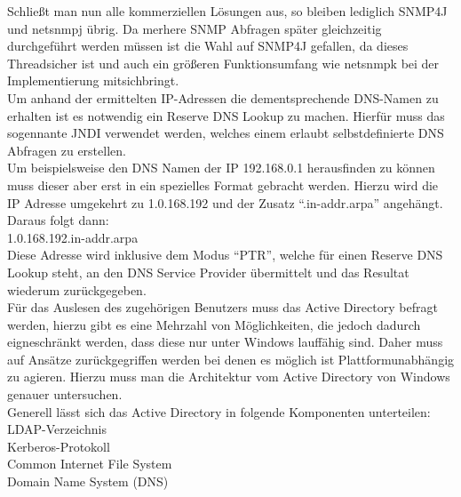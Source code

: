 Schließt man nun alle kommerziellen Lösungen aus, so bleiben lediglich SNMP4J und netsnmpj übrig. Da merhere SNMP Abfragen später gleichzeitig durchgeführt werden müssen ist die Wahl auf SNMP4J gefallen, da dieses Threadsicher ist und auch ein größeren Funktionsumfang wie netsnmpk bei der Implementierung mitsichbringt.\\
Um anhand der ermittelten IP-Adressen die dementsprechende DNS-Namen zu erhalten ist es notwendig ein Reserve DNS Lookup zu machen. Hierfür muss das sogennante JNDI verwendet werden, welches einem erlaubt selbstdefinierte DNS Abfragen zu erstellen.\\
Um beispielsweise den DNS Namen der IP 192.168.0.1 herausfinden zu können muss dieser aber erst in ein spezielles Format gebracht werden. Hierzu wird die IP Adresse umgekehrt zu 1.0.168.192 und der Zusatz “.in-addr.arpa” angehängt. Daraus folgt dann:\\

1.0.168.192.in-addr.arpa\\

Diese Adresse wird inklusive dem Modus “PTR”, welche für einen Reserve DNS Lookup steht, an den DNS Service Provider übermittelt und das Resultat wiederum zurückgegeben.\\

Für das Auslesen des zugehörigen Benutzers muss das Active Directory befragt werden, hierzu gibt es eine Mehrzahl von Möglichkeiten, die jedoch dadurch eigneschränkt werden, dass diese nur unter Windows lauffähig sind. Daher muss auf Ansätze zurückgegriffen werden bei denen es möglich ist Plattformunabhängig zu agieren. Hierzu muss man die Architektur vom Active Directory von Windows genauer untersuchen.\\
Generell lässt sich das Active Directory in folgende Komponenten unterteilen:\\
LDAP-Verzeichnis\\
Kerberos-Protokoll\\
Common Internet File System\\
Domain Name System (DNS)\\



